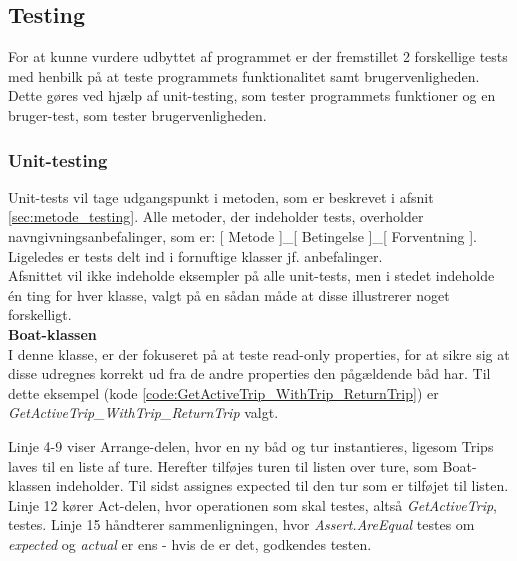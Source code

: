 \subsection{Testing}
\label{sec:imple_test}
For at kunne vurdere udbyttet af programmet er der fremstillet 2 forskellige tests med henbilk på at teste programmets funktionalitet samt brugervenligheden. Dette gøres ved hjælp af unit-testing, som tester programmets funktioner og en bruger-test, som tester brugervenligheden.

\subsubsection{Unit-testing}
Unit-tests vil tage udgangspunkt i metoden, som er beskrevet i afsnit \ref{sec:metode_testing}. Alle metoder, der indeholder tests, overholder navngivningsanbefalinger, som er: [ Metode ]\_[ Betingelse ]\_[ Forventning ]. Ligeledes er tests delt ind i fornuftige klasser jf. anbefalinger. \cite{Anbefal_unittest}\\

Afsnittet vil ikke indeholde eksempler på alle unit-tests, men i stedet indeholde én ting for hver klasse, valgt på en sådan måde at disse illustrerer noget forskelligt.\\

\textbf{Boat-klassen}\\
I denne klasse, er der fokuseret på at teste read-only properties, for at sikre sig at disse udregnes korrekt ud fra de andre properties den pågældende båd har. Til dette eksempel (kode \ref{code:GetActiveTrip_WithTrip_ReturnTrip}) er \textit{GetActiveTrip\_WithTrip\_ReturnTrip} valgt.


Linje 4-9 viser Arrange-delen, hvor en ny båd og tur instantieres, ligesom Trips laves til en liste af ture. Herefter tilføjes turen til listen over ture, som Boat-klassen indeholder. Til sidst assignes expected til den tur som er tilføjet til listen. \\

Linje 12 kører Act-delen, hvor operationen som skal testes, altså \textit{GetActiveTrip}, testes. Linje 15 håndterer sammenligningen, hvor \textit{Assert.AreEqual} testes om \textit{expected} og \textit{actual} er ens - hvis de er det, godkendes testen.\\

